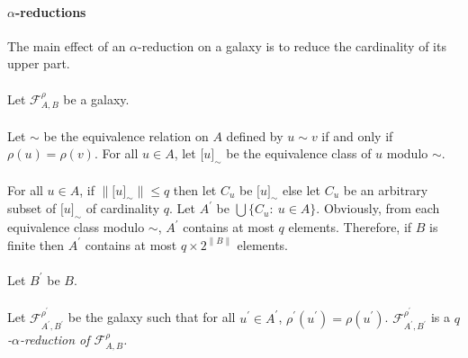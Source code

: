 \documentclass[draft]{article}
\begin{document}
\paragraph{$\alpha$-reductions}
%
%
The main effect of an $\alpha$-reduction on a galaxy is to reduce the cardinality of its upper part.
%
%
\\
\\
%
%
Let ${\mathcal F}_{A,B}^{\rho}$ be a galaxy.
%
%
\\
\\
%
%
Let $\sim$ be the equivalence relation on $A$ defined by $u{\sim}v$ if and only if $\rho(u){=}\rho(v)$.
For all $u{\in}A$, let $\lbrack u\rbrack_{\sim}$ be the equivalence class of $u$ modulo $\sim$.
%
%
\\
\\
%
%
For all $u{\in}A$, if ${\parallel}\lbrack u\rbrack_{\sim}{\parallel}{\leq}q$ then let $C_{u}$ be $\lbrack u\rbrack_{\sim}$ else let $C_{u}$ be an arbitrary subset of $\lbrack u\rbrack_{\sim}$ of cardinality $q$.
Let $A^{\prime}$ be $\bigcup\{C_{u}:\ u{\in}A\}$.
Obviously, from each equivalence class modulo $\sim$, $A^{\prime}$ contains at most $q$ elements.
Therefore, if $B$ is finite then $A^{\prime}$ contains at most $q{\times}2^{{\parallel}B{\parallel}}$ elements.
%
%
%
%
%
%
\\
\\
%
%
Let $B^{\prime}$ be $B$.
%
%
\\
\\
%
%
Let ${\mathcal F}_{A^{\prime},B^{\prime}}^{\rho^{\prime}}$ be the galaxy such that for all $u^{\prime}{\in}A^{\prime}$, $\rho^{\prime}(u^{\prime}){=}\rho(u^{\prime})$.
${\mathcal F}_{A^{\prime},B^{\prime}}^{\rho^{\prime}}$ is a {\it $q$-$\alpha$-reduction of ${\mathcal F}_{A,B}^{\rho}$.}
%
%
%
%
\end{document}
